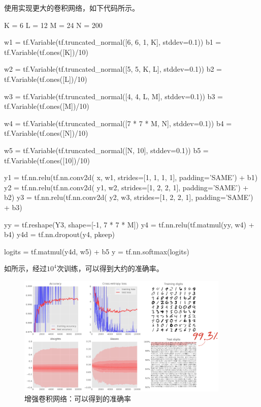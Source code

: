 \begin{content}
使用\tf{}实现更大的卷积网络，如下代码所示。

\begin{leftbar}
\begin{python}
K = 6
L = 12
M = 24
N = 200

w1 = tf.Variable(tf.truncated_normal([6, 6, 1, K], stddev=0.1))
b1 = tf.Variable(tf.ones([K])/10)

w2 = tf.Variable(tf.truncated_normal([5, 5, K, L], stddev=0.1))
b2 = tf.Variable(tf.ones([L])/10)

w3 = tf.Variable(tf.truncated_normal([4, 4, L, M], stddev=0.1))
b3 = tf.Variable(tf.ones([M])/10)

w4 = tf.Variable(tf.truncated_normal([7 * 7 * M, N], stddev=0.1))
b4 = tf.Variable(tf.ones([N])/10)

w5 = tf.Variable(tf.truncated_normal([N, 10], stddev=0.1))
b5 = tf.Variable(tf.ones([10])/10)

y1 = tf.nn.relu(tf.nn.conv2d(
       x,  w1, strides=[1, 1, 1, 1], padding='SAME') + b1)
y2 = tf.nn.relu(tf.nn.conv2d(
       y1, w2, strides=[1, 2, 2, 1], padding='SAME') + b2)
y3 = tf.nn.relu(tf.nn.conv2d(
       y2, w3, strides=[1, 2, 2, 1], padding='SAME') + b3)

yy = tf.reshape(Y3, shape=[-1, 7 * 7 * M])
y4 = tf.nn.relu(tf.matmul(yy, w4) + b4)
y4d = tf.nn.dropout(y4, pkeep)

logits = tf.matmul(y4d, w5) + b5
y = tf.nn.softmax(logits)
\end{python}
\end{leftbar}

如所示，经过$10^4$次训练，可以得到大约的准确率。

\begin{figure}[H]
\centering
\includegraphics[width=0.9\textwidth]{figures/mnist-conv2d-2-result.png}
\caption{增强卷积网络：可以得到的准确率}
 \label{fig:mnist-conv2d-2-result}
\end{figure}


\end{content}
